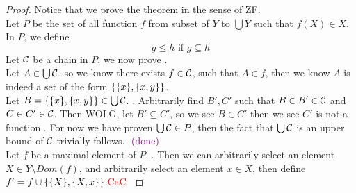 \documentclass{report}
\begin{document}
\begin{proof}
Notice that we prove the theorem in the sense of ZF.\\

  Let $P$ be the set of all function $f$ from subset of  $Y$ to  $\bigcup Y$ such that $f(X)\in X$. In $P$, we define
\begin{equation}
g\leq h\text{ if }g\subseteq h
\end{equation}
Let $\mathcal{C}$ be a chain in $P$, we  now prove .\\

Let $A \in \bigcup \mathcal{C}$, so we know there exists $f \in \mathcal{C}$, such that $A\in f$, then we know $A$ is indeed a set of the form  $\{ \{ x \},\{ x,y \} \}$.\\

Let $B=\{ \{ x \},\{ x,y \} \}\in \bigcup \mathcal{C}$. . Arbitrarily find $B',C'$ such that  $B\in B' \in \mathcal{C}$ and $C \in C'\in \mathcal{C}$. Then WOLG, let $B'\subseteq C'$, so we see $B\in C'$ then we see $C'$ is not a function  \CaC. For now we have proven $\bigcup \mathcal{C} \in P$, then the fact that $\bigcup \mathcal{C}$ is an upper bound of $\mathcal{C}$ trivially follows. $\textcolor{violet}{\text{ (done) }}$ \\

Let $f$ be a maximal element of  $P$. . Then we can arbitrarily select an element $X\in Y\setminus Dom(f)$, and arbitrarily select an element $x\in X$, then define $f'=f\cup \{ \{ X \},\{ X,x \} \}\text{ \textcolor{red}{CaC} }$
\end{proof}
\end{document}
